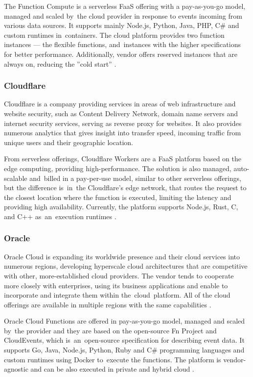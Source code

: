 The Function Compute is a serverless FaaS offering with a pay-as-you-go model, managed and scaled by~the cloud provider in response to events incoming from various data sources. It supports mainly Node.js, Python, Java, PHP, C\# and custom runtimes in~containers. The cloud platform provides two function instances --- the flexible functions, and~instances with the higher specifications for better performance. Additionally, vendor offers reserved instances that are always on, reducing the ''cold start'' \cite{AlibabaFunctionCompute}.

\subsubsection{Cloudflare}

Cloudflare is a company providing services in areas of web infrastructure and website security, such as Content Delivery Network, domain name servers and internet security services, serving as reverse proxy for websites. It also provides numerous analytics that gives insight into transfer speed, incoming traffic from unique users and their geographic location.

From serverless offerings, Cloudflare Workers are a FaaS platform based on the edge computing, providing high-performance. The solution is also managed, auto-scalable and~billed in a pay-per-use model, similar to other serverless offerings, but the difference is~in~the Cloudflare's edge network, that routes the request to the closest location where the function is executed, limiting the latency and providing high availability. Currently, the platform supports Node.js, Rust, C, and C++ as~an~execution runtimes \cite{CloudflareWorkers}.

\subsubsection{Oracle}

Oracle Cloud is expanding its worldwide presence and their cloud services into numerous regions, developing hyperscale cloud architectures that are competitive with other, more-established cloud providers. The vendor tends to cooperate more closely with enterprises, using its business applications and enable to incorporate and integrate them within the~cloud~platform. All of the cloud offerings are available in multiple regions with the same capabilities \cite{Gartner}.

Oracle Cloud Functions are offered in pay-as-you-go model, managed and scaled by~the provider and they are based on the open-source Fn Project and CloudEvents, which is~an~open-source specification for describing event data. It supports Go, Java, Node.js, Python, Ruby and C\# programming languages and custom runtimes using Docker to~execute the functions. The platform is vendor-agnostic and can be also executed in private and hybrid cloud \cite{FnProject}.

